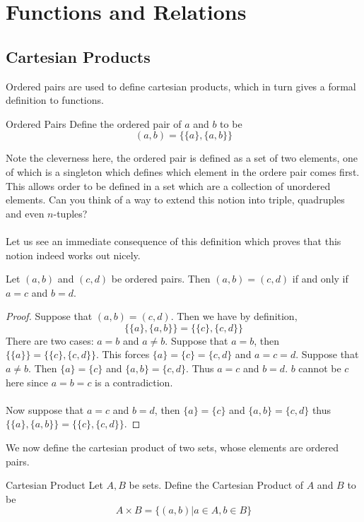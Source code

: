 \pagebreak
\section{Functions and Relations}
\subsection{Cartesian Products}
Ordered pairs are used to define cartesian products, which in turn gives a formal definition to functions. 
\begin{defn}{Ordered Pairs}{} Define the ordered pair of $a$ and $b$ to be $$(a,b)=\{\{a\},\{a,b\}\}$$
\end{defn}

Note the cleverness here, the ordered pair is defined as a set of two elements, one of which is a singleton which defines which element in the ordere pair comes first. This allows order to be defined in a set which are a collection of unordered elements. Can you think of a way to extend this notion into triple, quadruples and even $n$-tuples?\\~\\

Let us see an immediate consequence of this definition which proves that this notion indeed works out nicely. 

\begin{prp}{}{} Let $(a,b)$ and $(c,d)$ be ordered pairs. Then $(a,b)=(c,d)$ if and only if $a=c$ and $b=d$. \tcbline
\begin{proof} Suppose that $(a,b)=(c,d)$. Then we have by definition, $$\{\{a\},\{a,b\}\}=\{\{c\},\{c,d\}\}$$ There are two cases: $a=b$ and $a\neq b$. Suppose that $a=b$, then $\{\{a\}\}=\{\{c\},\{c,d\}\}$. This forces $\{a\}=\{c\}=\{c,d\}$ and $a=c=d$. Suppose that $a\neq b$. Then $\{a\}=\{c\}$ and $\{a,b\}=\{c,d\}$. Thus $a=c$ and $b=d$. $b$ cannot be $c$ here since $a=b=c$ is a contradiction. \\~\\

Now suppose that $a=c$ and $b=d$, then $\{a\}=\{c\}$ and $\{a,b\}=\{c,d\}$ thus $\{\{a\},\{a,b\}\}=\{\{c\},\{c,d\}\}$. 
\end{proof}
\end{prp}

We now define the cartesian product of two sets, whose elements are ordered pairs. 

\begin{defn}{Cartesian Product}{} Let $A,B$ be sets. Define the Cartesian Product of $A$ and $B$ to be $$A\times B=\{(a,b)|a\in A, b\in B\}$$
\end{defn}

